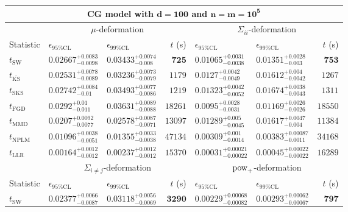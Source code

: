 \begin{tabular}{l|llr|llr}
	\toprule
	\multicolumn{7}{c}{{\bf CG model with $\mathbf{d=100}$ and $\mathbf{n=m=10^{5}}$}} \\
	\toprule
	\multicolumn{1}{c}{} & \multicolumn{3}{c}{$\mu$-deformation} & \multicolumn{3}{c}{$\Sigma_{ii}$-deformation} \\
	Statistic & $\epsilon_{95\%\mathrm{CL}}$ & $\epsilon_{99\%\mathrm{CL}}$ & $t$ (s) & $\epsilon_{95\%\mathrm{CL}}$ & $\epsilon_{99\%\mathrm{CL}}$ & $t$ (s) \\
	\midrule
	$t_{\mathrm{SW}}$ & $0.02667_{-0.0098}^{+0.0083}$ & $0.03433_{-0.008}^{+0.0074}$ & ${\mathbf{725}}$ & $0.01065_{-0.0038}^{+0.0031}$ & $0.01351_{-0.003}^{+0.0028}$ & ${\mathbf{753}}$ \\
	$t_{\overline{\mathrm{KS}}}$ & $0.02531_{-0.0089}^{+0.0078}$ & $0.03236_{-0.0079}^{+0.0073}$ & $1179$ & $0.0127_{-0.0049}^{+0.0042}$ & $0.01612_{-0.0042}^{+0.004}$ & $1267$ \\
	$t_{\mathrm{SKS}}$ & $0.02742_{-0.01}^{+0.0084}$ & $0.03493_{-0.0086}^{+0.0077}$ & $1219$ & $0.01323_{-0.0052}^{+0.0042}$ & $0.01674_{-0.0043}^{+0.0038}$ & $1311$ \\
	$t_{\mathrm{FGD}}$ & $0.0292_{-0.011}^{+0.01}$ & $0.03631_{-0.0088}^{+0.0089}$ & $18261$ & ${\mathbf{0.0095_{-0.0031}^{+0.0028}}}$ & ${\mathbf{0.01169_{-0.0026}^{+0.0026}}}$ & $18550$ \\
	$t_{\mathrm{MMD}}$ & ${\mathbf{0.0207_{-0.0077}^{+0.0092}}}$ & ${\mathbf{0.02578_{-0.0071}^{+0.0087}}}$ & $13097$ & $0.01289_{-0.0045}^{+0.005}$ & $0.01617_{-0.004}^{+0.0047}$ & $11384$ \\
\rowcolor{red!35}	$t_{\mathrm{NPLM}}$ & $0.01096_{-0.0051}^{+0.0038}$ & $0.01355_{-0.0038}^{+0.0033}$ & $47134$ & $0.00309_{-0.0014}^{+0.001}$ & $0.00383_{-0.0011}^{+0.00087}$ & $34168$ \\
	$t_{\mathrm{LLR}}$ & $0.00164_{-0.0012}^{+0.0012}$ & $0.00237_{-0.0012}^{+0.0012}$ & $15370$ & $0.00031_{-0.00022}^{+0.00021}$ & $0.00045_{-0.00022}^{+0.00022}$ & $16289$ \\
	\toprule
	\multicolumn{1}{c}{} & \multicolumn{3}{c}{$\Sigma_{i\neq j}$-deformation} & \multicolumn{3}{c}{$\rm{pow}_{+}$-deformation} \\
	Statistic & $\epsilon_{95\%\mathrm{CL}}$ & $\epsilon_{99\%\mathrm{CL}}$ & $t$ (s) & $\epsilon_{95\%\mathrm{CL}}$ & $\epsilon_{99\%\mathrm{CL}}$ & $t$ (s) \\
	\midrule
	$t_{\mathrm{SW}}$ & $0.02377_{-0.0087}^{+0.0066}$ & $0.03118_{-0.0069}^{+0.0056}$ & ${\mathbf{3290}}$ & $0.00229_{-0.00082}^{+0.00068}$ & $0.00293_{-0.00067}^{+0.00062}$ & ${\mathbf{797}}$ \\

\end{tabular}
